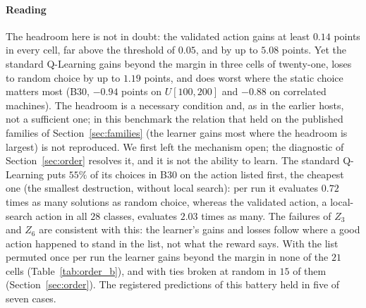 \paragraph{Reading} The headroom here is not in doubt: the validated action gains at least $0.14$ points in every cell, far above the threshold of $0.05$, and by up to $5.08$ points. Yet the standard Q-Learning gains beyond the margin in three cells of twenty-one, loses to random choice by up to $1.19$ points, and does worst where the static choice matters most (B30, $-0.94$ points on $U[100,200]$ and $-0.88$ on correlated machines). The headroom is a necessary condition and, as in the earlier hosts, not a sufficient one; in this benchmark the relation that held on the published families of Section~\ref{sec:families} (the learner gains most where the headroom is largest) is not reproduced. We first left the mechanism open; the diagnostic of Section~\ref{sec:order} resolves it, and it is not the ability to learn. The standard Q-Learning puts $55\%$ of its choices in B30 on the action listed first, the cheapest one (the smallest destruction, without local search): per run it evaluates $0.72$ times as many solutions as random choice, whereas the validated action, a local-search action in all $28$ classes, evaluates $2.03$ times as many. The failures of $Z_3$ and $Z_6$ are consistent with this: the learner's gains and losses follow where a good action happened to stand in the list, not what the reward says. With the list permuted once per run the learner gains beyond the margin in none of the $21$ cells (Table~\ref{tab:order_b}), and with ties broken at random in $15$ of them (Section~\ref{sec:order}). The registered predictions of this battery held in five of seven cases.


